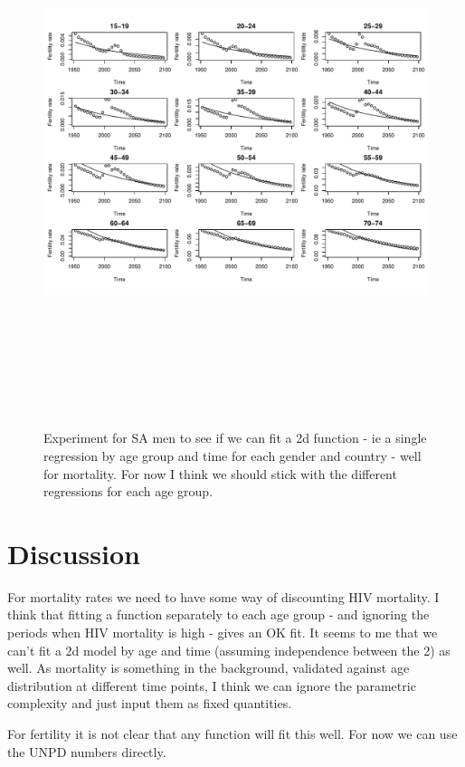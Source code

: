 \documentclass{article}
\begin{document}
\begin{figure}
\includegraphics[width=16cm,height=16cm]{EstimatingRatesFromUNPD-TestSAmortality2d} 

\caption{Experiment for SA men to see if we can fit a 2d function - ie a single regression by age group and time for each gender and country -  well for mortality. For now I think we should stick with the different regressions for each age group.}
\label{FertilityZam}
\end{figure}

\section*{Discussion}

For mortality rates we need to have some way of discounting HIV mortality. I think that fitting a function separately to each age group  - and ignoring the periods when HIV mortality is high - gives an OK fit. It seems to me that we can't fit a 2d model by age and time (assuming independence between the 2) as well. As mortality is something in the background, validated against age distribution at different time points, I think we can ignore the parametric complexity and just input them as fixed quantities.

For fertility it is not clear that any function will fit this well. For now we can use the UNPD numbers directly.
\end{document}
